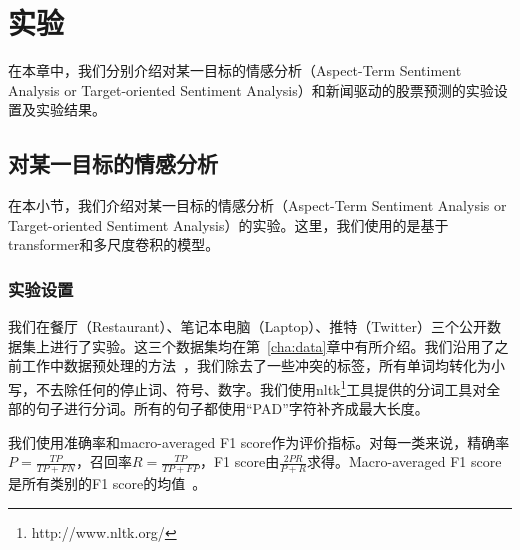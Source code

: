 \chapter{实验}
\label{cha:experiment}
在本章中，我们分别介绍对某一目标的情感分析（Aspect-Term Sentiment Analysis or Target-oriented Sentiment Analysis）和新闻驱动的股票预测的实验设置及实验结果。

\section{对某一目标的情感分析}
在本小节，我们介绍对某一目标的情感分析（Aspect-Term Sentiment Analysis or Target-oriented Sentiment Analysis）的实验。这里，我们使用的是基于transformer和多尺度卷积的模型。
\subsection{实验设置}
我们在餐厅（Restaurant）、笔记本电脑（Laptop）、推特（Twitter）三个公开数据集上进行了实验。这三个数据集均在第~\ref{cha:data}章中有所介绍。我们沿用了之前工作中数据预处理的方法~\cite{Xin2018Transformation,Tang2015Effective}，我们除去了一些冲突的标签，所有单词均转化为小写，不去除任何的停止词、符号、数字。我们使用nltk\footnote{http://www.nltk.org/}工具提供的分词工具对全部的句子进行分词。所有的句子都使用“PAD”字符补齐成最大长度。

我们使用准确率和macro-averaged F1 score作为评价指标。对每一类来说，精确率$P=\frac{TP}{TP+FN}$，召回率$R=\frac{TP}{TP+FP}$，F1 score由$\frac{2PR}{P+R}$求得。Macro-averaged F1 score是所有类别的F1 score的均值~\cite{Tang2015Effective}。

